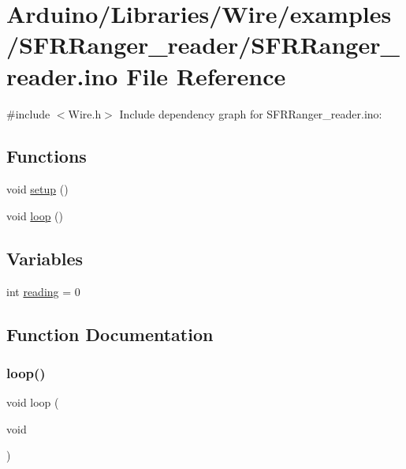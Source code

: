 \hypertarget{_s_f_r_ranger__reader_8ino}{}\section{Arduino/\+Libraries/\+Wire/examples/\+S\+F\+R\+Ranger\+\_\+reader/\+S\+F\+R\+Ranger\+\_\+reader.ino File Reference}
\label{_s_f_r_ranger__reader_8ino}
{\ttfamily \#include $<$Wire.\+h$>$}\newline
Include dependency graph for S\+F\+R\+Ranger\+\_\+reader.\+ino\+:
\subsection*{Functions}
\begin{DoxyCompactItemize}
\item 
void \hyperlink{_s_f_r_ranger__reader_8ino_a4fc01d736fe50cf5b977f755b675f11d}{setup} ()
\item 
void \hyperlink{_s_f_r_ranger__reader_8ino_afe461d27b9c48d5921c00d521181f12f}{loop} ()
\end{DoxyCompactItemize}
\subsection*{Variables}
\begin{DoxyCompactItemize}
\item 
int \hyperlink{_s_f_r_ranger__reader_8ino_a5fa8d7fdcda2ed9555ad800a40a1a810}{reading} = 0
\end{DoxyCompactItemize}


\subsection{Function Documentation}
\mbox{\label{_s_f_r_ranger__reader_8ino_afe461d27b9c48d5921c00d521181f12f}} 
\subsubsection{\texorpdfstring{loop()}{loop()}}
{\footnotesize\ttfamily void loop (\begin{DoxyParamCaption}\item[{void}]{ }\end{DoxyParamCaption})}

